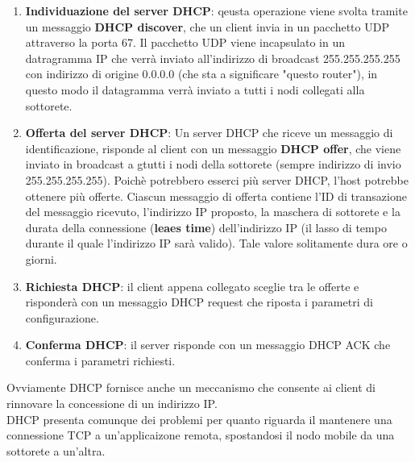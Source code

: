\documentclass[11pt,a4paper]{book}
\begin{document}
\begin{enumerate}
	\item \textbf{Individuazione del server DHCP}: qeusta operazione viene svolta tramite un messaggio \textbf{DHCP discover}, che un client invia in un pacchetto UDP attraverso la porta 67. Il pacchetto UDP viene incapsulato in un datragramma IP che verrà inviato all'indirizzo di broadcast 255.255.255.255 con indirizzo di origine 0.0.0.0 (che sta a significare "questo router"), in questo modo il datagramma verrà inviato a tutti i nodi collegati alla sottorete.
	\item \textbf{Offerta del server DHCP}: Un server DHCP che riceve un messaggio di identificazione, risponde al client con un messaggio \textbf{DHCP offer}, che viene inviato in broadcast a gtutti i nodi della sottorete (sempre indirizzo di invio 255.255.255.255). Poichè potrebbero esserci più server DHCP, l'host potrebbe ottenere più offerte. Ciascun messaggio di offerta contiene l'ID di transazione del messaggio ricevuto, l'indirizzo IP proposto, la maschera di sottorete e la durata della connessione (\textbf{leaes time}) dell'indirizzo IP (il lasso di tempo durante il quale l'indirizzo IP sarà valido). Tale valore solitamente dura ore o giorni.
	\item \textbf{Richiesta DHCP}: il client appena collegato sceglie tra le offerte e risponderà con un messaggio DHCP request che riposta i parametri di configurazione.
	\item \textbf{Conferma DHCP}: il server risponde con un messaggio DHCP ACK che conferma i parametri richiesti.
\end{enumerate}
Ovviamente DHCP fornisce anche un meccanismo che consente ai client di rinnovare la concessione di un indirizzo IP. \\
DHCP presenta comunque dei problemi per quanto riguarda il mantenere una connessione TCP a un'applicaizone remota, spostandosi il nodo mobile da una sottorete a un'altra.
\end{document}
